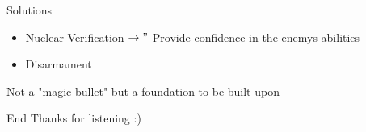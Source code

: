 \documentclass{beamer}
\begin{document}
    \begin{frame}{Solutions}
        \begin{itemize}
            \setlength\itemsep{2em}
            \item Nuclear Verification $\rightarrow"$ Provide confidence in the enemys abilities
            \item Disarmament
        \end{itemize}
        \begin{center}
            Not a "magic bullet" but a foundation to be built upon
        \end{center}
    \end{frame}

    \begin{frame}{End}
        Thanks for listening :) 
    \end{frame}
    
    \begin{frame}
        
        {}
    \end{frame}
\end{document}
